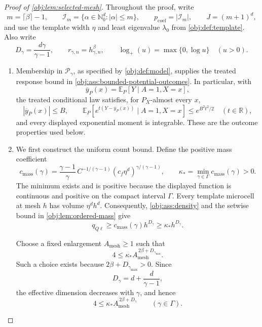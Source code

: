 \begin{proof}[Proof of \cref{obj:lem:selected-mesh}]
Throughout the proof, write
\[
m=\lceil\beta\rceil-1,\qquad
\mathcal I_m=\{\alpha\in\mathbb N_0^d:|\alpha|\le m\},
\qquad
p_{\mathrm{coef}}=|\mathcal I_m|,
\qquad
J=(m+1)^d,
\]
and use the template width \(\eta\) and least eigenvalue \(\lambda_0\) from
\cref{obj:def:template}. Also write
\[
D_\gamma=\frac{d\gamma}{\gamma-1},
\qquad
r_{\gamma,n}=h_{\gamma,n}^{\beta},
\qquad
\log_+(u)=\max\{0,\log u\}\quad(u>0).
\]

\begin{enumerate}
\item Membership in \(\mathcal P_\gamma\), as specified by
\cref{obj:def:model}, supplies the treated response bound in
\cref{obj:ass:bounded-potential-outcomes}. In particular, with
\[
\overline y_P(x)=\mathbb E_P[Y\mid A=1,X=x],
\]
the treated conditional law satisfies, for \(P_X\)-almost every \(x\),
\[
|\overline y_P(x)|\le B,\qquad
\mathbb E_P\!\left[
 e^{t(Y-\overline y_P(x))}\mid A=1,X=x
\right]\le e^{B^2t^2/2}
\quad(t\in\mathbb R),
\]
and every displayed exponential moment is integrable. These are the
outcome properties used below.

\item We first construct the uniform count bound. Define the positive mass
coefficient
\[
c_{\mathrm{mass}}(\gamma)
=
\frac{\gamma-1}{\gamma}\,
C^{-1/(\gamma-1)}
(c_f\eta^d)^{\gamma/(\gamma-1)},
\qquad
\kappa_*=\min_{\gamma\in\Gamma}c_{\mathrm{mass}}(\gamma)>0.
\]
The minimum exists and is positive because the displayed function is
continuous and positive on the compact interval \(\Gamma\).
Every template microcell at mesh \(h\) has volume \(\eta^dh^d\).
Consequently, \cref{obj:ass:density} and the setwise bound in
\cref{obj:lem:ordered-mass} give
\[
q_{Q\ell}\ge c_{\mathrm{mass}}(\gamma)h^{D_\gamma}
\ge\kappa_*h^{D_\gamma}.
\]

Choose a fixed enlargement \(A_{\mathrm{mesh}}\ge1\) such that
\[
4\le
\kappa_*A_{\mathrm{mesh}}^{\,2\beta+D_{\gamma_{\max}}}.
\]
Such a choice exists because \(2\beta+D_{\gamma_{\max}}>0\).
Since
\[
D_\gamma=d+\frac d{\gamma-1},
\]
the effective dimension decreases with \(\gamma\), and hence
\[
4\le
\kappa_*A_{\mathrm{mesh}}^{\,2\beta+D_\gamma}
\qquad(\gamma\in\Gamma).
\]


\end{enumerate}
\end{proof}
